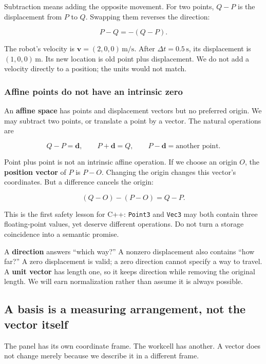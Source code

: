 Subtraction means adding the opposite movement. For two points, \(Q-P\) is the displacement from \(P\) to \(Q\). Swapping them reverses the direction:

\[
P-Q=-(Q-P).
\]

The robot's velocity is \(\mathbf v=(2,0,0)\,\mathrm{m/s}\). After \(\Delta t=0.5\,\mathrm s\), its displacement is \((1,0,0)\,\mathrm m\). Its new location is old point plus displacement. We do not add a velocity directly to a position; the units would not match.

\subsubsection{Affine points do not have an intrinsic zero}\label{01-foundations-i-ch017-affine-points-do-not-have-an-intrinsic-zero}

An \textbf{affine space} has points and displacement vectors but no preferred origin. We may subtract two points, or translate a point by a vector. The natural operations are

\[
Q-P=\mathbf d,\qquad P+\mathbf d=Q,\qquad P-\mathbf d=\text{another point}.
\]

Point plus point is not an intrinsic affine operation. If we choose an origin \(O\), the \textbf{position vector} of \(P\) is \(P-O\). Changing the origin changes this vector's coordinates. But a difference cancels the origin:

\[
(Q-O)-(P-O)=Q-P.
\]

This is the first safety lesson for C++: \texttt{Point3} and \texttt{Vec3} may both contain three floating-point values, yet deserve different operations. Do not turn a storage coincidence into a semantic promise.

A \textbf{direction} answers ``which way?'' A nonzero displacement also contains ``how far?'' A zero displacement is valid; a zero direction cannot specify a way to travel. A \textbf{unit vector} has length one, so it keeps direction while removing the original length. We will earn normalization rather than assume it is always possible.

\subsection{A basis is a measuring arrangement, not the vector itself}\label{01-foundations-i-ch017-a-basis-is-a-measuring-arrangement-not-the-vector-itself}

The panel has its own coordinate frame. The workcell has another. A vector does not change merely because we describe it in a different frame.

